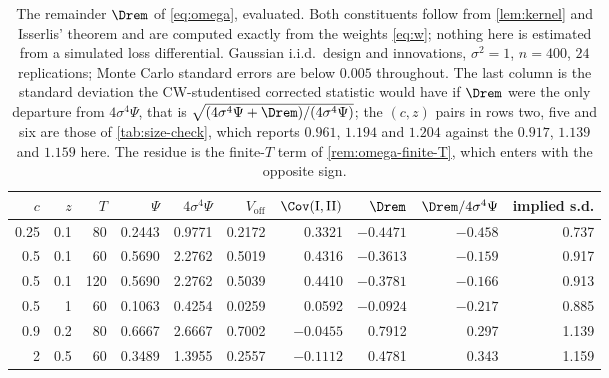 \begin{table}[htbp]
\centering
\caption{The remainder $\Drem$ of \eqref{eq:omega}, evaluated. Both
constituents follow from \cref{lem:kernel} and Isserlis' theorem and are
computed exactly from the weights \eqref{eq:w}; nothing here is estimated from
a simulated loss differential. Gaussian i.i.d.\ design and innovations,
$\sigma^2=1$, $n=400$, $24$ replications; Monte Carlo standard errors are
below $0.005$ throughout. The last column is the standard deviation the
CW-studentised corrected statistic would have if $\Drem$ were the
only departure from $4\sigma^4\Psi$, that is
$\sqrt{(4\sigma^4\Psi+\Drem)/(4\sigma^4\Psi)}$; the $(c,z)$ pairs in rows two,
five and six are those of \cref{tab:size-check}, which reports $0.961$, $1.194$
and $1.204$ against the $0.917$, $1.139$ and $1.159$ here. The residue is the
finite-$T$ term of \cref{rem:omega-finite-T}, which enters with the opposite
sign.}
\label{tab:delta}
\small
\begin{tabular}{rrr rrr rr rr}
\toprule
$c$ & $z$ & $T$ & $\Psi$ & $4\sigma^4\Psi$ & $V_{\mathrm{off}}$ & $\Cov(\mathrm I,\mathrm{II})$ & $\Drem$ & $\Drem/4\sigma^4\Psi$ & implied s.d. \\
\midrule
0.25 & 0.1 & 80 & 0.2443 & 0.9771 & 0.2172 & 0.3321 & $-0.4471$ & $-0.458$ & 0.737 \\
0.5 & 0.1 & 60 & 0.5690 & 2.2762 & 0.5019 & 0.4316 & $-0.3613$ & $-0.159$ & 0.917 \\
0.5 & 0.1 & 120 & 0.5690 & 2.2762 & 0.5039 & 0.4410 & $-0.3781$ & $-0.166$ & 0.913 \\
0.5 & 1 & 60 & 0.1063 & 0.4254 & 0.0259 & 0.0592 & $-0.0924$ & $-0.217$ & 0.885 \\
0.9 & 0.2 & 80 & 0.6667 & 2.6667 & 0.7002 & $-0.0455$ & 0.7912 & 0.297 & 1.139 \\
2 & 0.5 & 60 & 0.3489 & 1.3955 & 0.2557 & $-0.1112$ & 0.4781 & 0.343 & 1.159 \\
\bottomrule
\end{tabular}
\end{table}
